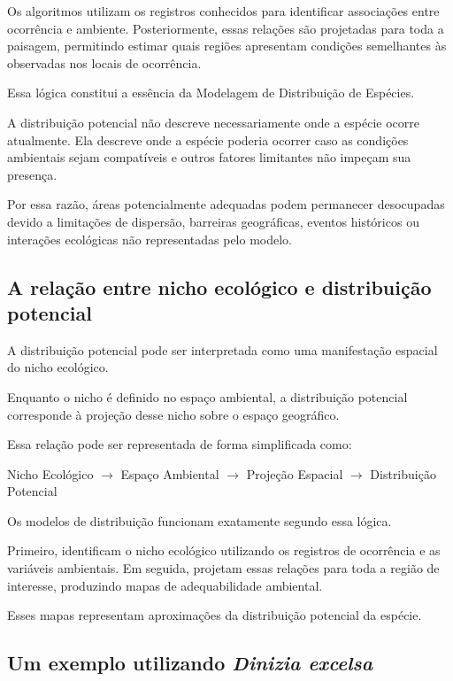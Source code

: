 Os algoritmos utilizam os registros conhecidos para identificar associações entre ocorrência e ambiente. Posteriormente, essas relações são projetadas para toda a paisagem, permitindo estimar quais regiões apresentam condições semelhantes às observadas nos locais de ocorrência.

Essa lógica constitui a essência da Modelagem de Distribuição de Espécies.

A distribuição potencial não descreve necessariamente onde a espécie ocorre atualmente. Ela descreve onde a espécie poderia ocorrer caso as condições ambientais sejam compatíveis e outros fatores limitantes não impeçam sua presença.

Por essa razão, áreas potencialmente adequadas podem permanecer desocupadas devido a limitações de dispersão, barreiras geográficas, eventos históricos ou interações ecológicas não representadas pelo modelo.

\subsection{A relação entre nicho ecológico e distribuição potencial}

A distribuição potencial pode ser interpretada como uma manifestação espacial do nicho ecológico.

Enquanto o nicho é definido no espaço ambiental, a distribuição potencial corresponde à projeção desse nicho sobre o espaço geográfico.

Essa relação pode ser representada de forma simplificada como:

\begin{center}
	Nicho Ecológico
	$\rightarrow$
	Espaço Ambiental
	$\rightarrow$
	Projeção Espacial
	$\rightarrow$
	Distribuição Potencial
\end{center}

Os modelos de distribuição funcionam exatamente segundo essa lógica.

Primeiro, identificam o nicho ecológico utilizando os registros de ocorrência e as variáveis ambientais. Em seguida, projetam essas relações para toda a região de interesse, produzindo mapas de adequabilidade ambiental.

Esses mapas representam aproximações da distribuição potencial da espécie.

\subsection{Um exemplo utilizando \textit{Dinizia excelsa}}

